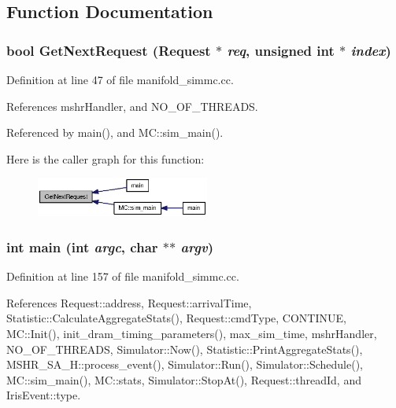\subsection{Function Documentation}
\subsubsection[{GetNextRequest}]{\setlength{\rightskip}{0pt plus 5cm}bool GetNextRequest ({\bf Request} $\ast$ {\em req}, \/  unsigned int $\ast$ {\em index})}\label{manifold__simmc_8cc_26e5d15bc9c5f1f3b6827de96fee7b53}




Definition at line 47 of file manifold\_\-simmc.cc.

References mshrHandler, and NO\_\-OF\_\-THREADS.

Referenced by main(), and MC::sim\_\-main().

Here is the caller graph for this function:\nopagebreak
\begin{figure}[H]
\begin{center}
\leavevmode
\includegraphics[width=161pt]{manifold__simmc_8cc_26e5d15bc9c5f1f3b6827de96fee7b53_icgraph}
\end{center}
\end{figure}
\subsubsection[{main}]{\setlength{\rightskip}{0pt plus 5cm}int main (int {\em argc}, \/  char $\ast$$\ast$ {\em argv})}\label{manifold__simmc_8cc_3c04138a5bfe5d72780bb7e82a18e627}




Definition at line 157 of file manifold\_\-simmc.cc.

References Request::address, Request::arrivalTime, Statistic::CalculateAggregateStats(), Request::cmdType, CONTINUE, MC::Init(), init\_\-dram\_\-timing\_\-parameters(), max\_\-sim\_\-time, mshrHandler, NO\_\-OF\_\-THREADS, Simulator::Now(), Statistic::PrintAggregateStats(), MSHR\_\-SA\_\-H::process\_\-event(), Simulator::Run(), Simulator::Schedule(), MC::sim\_\-main(), MC::stats, Simulator::StopAt(), Request::threadId, and IrisEvent::type.

